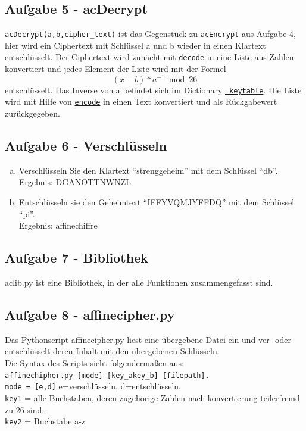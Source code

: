 \documentclass[12pt]{article}
\begin{document}
		\subsection{Aufgabe 5 - acDecrypt}
			\texttt{acDecrypt(a,b,cipher\_text)} ist das Gegenst\"uck zu \texttt{acEncrypt} aus \hyperref[ssec:Aufgabe4]{Aufgabe 4}, hier wird ein Ciphertext mit Schl\"ussel a und b wieder in einen Klartext entschl\"usselt.
Der Ciphertext wird zun\"acht mit \hyperref[ssec:Aufgabe1]{\texttt{decode}} in eine Liste aus Zahlen konvertiert und jedes Element der Liste wird mit der Formel
\[ (x - b) * a^{-1} \bmod 26\]
entschl\"usselt.
Das Inverse von a befindet sich im Dictionary \hyperref[ssec:Aufgabe3]{\texttt{\_keytable}}.
Die Liste wird mit Hilfe von \hyperref[ssec:Aufgabe2]{\texttt{encode}} in einen Text konvertiert und als R\"uckgabewert zur\"uckgegeben.
			
			
		\subsection{Aufgabe 6 - Verschl\"usseln}
		\begin{enumerate}[a)]
			\item Verschl\"usseln Sie den Klartext \enquote{strenggeheim} mit dem Schl\"ussel \enquote{db}.\\
Ergebnis: DGANOTTNWNZL

			\item Entschl\"usseln sie den Geheimtext \enquote{IFFYVQMJYFFDQ} mit dem Schl\"ussel \enquote{pi}.\\
Ergebnis: affinechiffre
		\end{enumerate}
 
		\subsection{Aufgabe 7 - Bibliothek}
			aclib.py ist eine Bibliothek, in der alle Funktionen zusammengefasst sind.
	
		\subsection{Aufgabe 8 - affinecipher.py}
			Das Pythonscript affinecipher.py liest eine \"ubergebene Datei ein und ver- oder entschl\"usselt deren Inhalt mit den \"ubergebenen Schl\"usseln.\\
Die Syntax des Scripts sieht folgenderma{\ss}en aus:\\
\texttt{affinechipher.py [mode] [key\_akey\_b] [filepath].}\\
\texttt{mode = [e,d]} e=verschl\"usseln, d=entschl\"usseln.\\
\texttt{key1} = alle Buchstaben, deren zugeh\"orige Zahlen nach konvertierung teilerfremd zu 26 sind.\\
\texttt{key2} = Buchstabe a-z\\[0.3cm]
\end{document}
